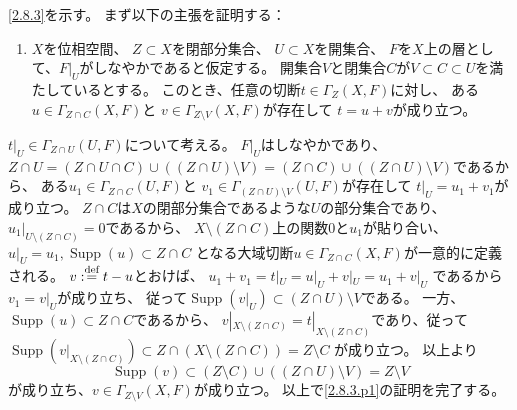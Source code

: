 \documentclass[uplatex,dvipdfmx]{jsarticle}
\makeatletter
\theoremstyle{definition}
\renewenvironment{proof}[1][\proofname]{
  \pushQED{\qed}%
  \normalfont \topsep6\p@\@plus6\p@\relax
  \trivlist
  \item[\hskip\labelsep
    #1\@addpunct{\textbf{.}}]\ignorespaces
}{%
  \popQED\endtrivlist\@endpefalse
}
\providecommand{\proofname}{証明}
\DeclareMathOperator{\Supp}{\mathrm{Supp}}
\def\dfn{:\overset{\mbox{{\scriptsize def}}}{=}}
\makeatother
\begin{document}
\begin{proof}
  \ref{2.8.3}を示す。
  まず以下の主張を証明する：
  \begin{enumerate}[label=(\fnsymbol*),start=2]
    \item \label{2.8.3.p1}
    \(X\)を位相空間、
    \(Z\subset X\)を閉部分集合、
    \(U\subset X\)を開集合、
    \(F\)を\(X\)上の層として、\(F|_U\)がしなやかであると仮定する。
    開集合\(V\)と閉集合\(C\)が\(V\subset C\subset U\)を満たしているとする。
    このとき、任意の切断\(t\in \Gamma_Z(X,F)\)に対し、
    ある\(u\in \Gamma_{Z\cap C}(X,F)\)と
    \(v\in \Gamma_{Z\setminus V}(X,F)\)が存在して
    \(t=u+v\)が成り立つ。
  \end{enumerate}
  \(t|_U\in \Gamma_{Z\cap U}(U,F)\)について考える。
  \(F|_U\)はしなやかであり、
  \(Z\cap U = (Z\cap U\cap C) \cup ((Z\cap U)\setminus V)
  = (Z\cap C) \cup ((Z\cap U)\setminus V)\)であるから、
  ある\(u_1\in \Gamma_{Z\cap C}(U,F)\)と
  \(v_1\in \Gamma_{(Z\cap U)\setminus V}(U,F)\)が存在して
  \(t|_U = u_1+v_1\)が成り立つ。
  \(Z\cap C\)は\(X\)の閉部分集合であるような\(U\)の部分集合であり、
  \(u_1|_{U\setminus (Z\cap C)} = 0\)であるから、
  \(X\setminus (Z\cap C)\)上の関数\(0\)と\(u_1\)が貼り合い、
  \(u|_U = u_1, \Supp(u) \subset Z\cap C\)
  となる大域切断\(u\in \Gamma_{Z\cap C}(X,F)\)が一意的に定義される。
  \(v \dfn t-u\)とおけば、
  \(u_1+v_1 = t|_U = u|_U + v|_U = u_1 + v|_U\)
  であるから\(v_1 = v|_U\)が成り立ち、
  従って\(\Supp(v|_U)\subset (Z\cap U)\setminus V\)である。
  一方、\(\Supp(u)\subset Z\cap C\)であるから、
  \(v|_{X\setminus(Z\cap C)} = t|_{X\setminus (Z\cap C)}\)であり、従って
  \(\Supp(v|_{X\setminus(Z\cap C)}) \subset Z\cap (X\setminus (Z\cap C)) = Z\setminus C\)
  が成り立つ。
  以上より
  \[
  \Supp(v)\subset (Z\setminus C)\cup ((Z\cap U)\setminus V) = Z\setminus V
  \]
  が成り立ち、\(v\in \Gamma_{Z\setminus V}(X,F)\)が成り立つ。
  以上で\ref{2.8.3.p1}の証明を完了する。


\end{proof}
\end{document}
